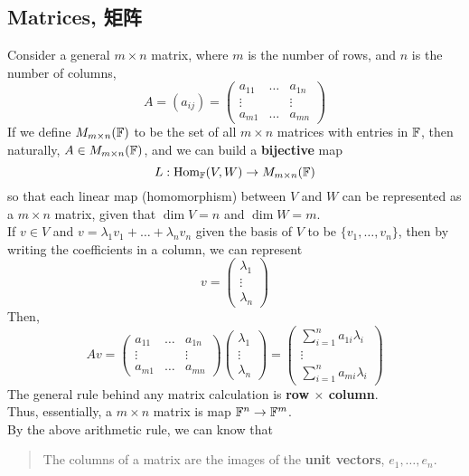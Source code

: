 \subsection{Matrices, 矩阵}
Consider a general $m\times n$ matrix, where $m$ is the number of rows, and $n$ is the number of columns,
$$A = (a_{ij}) =
\begin{pmatrix}
    a_{11} & \dots & a_{1n} \\
    \vdots & & \vdots \\
    a_{m1} & \dots & a_{mn}
\end{pmatrix}
$$
If we define $M_{m \times n}(\mathbb{F})$ to be the set of all $m \times n$ matrices with entries in $\mathbb{F}$, then naturally, $A \in M_{m \times n}(\mathbb{F})$, and we can build a \textbf{bijective} map
$$L: \text{Hom}_{\mathbb{F}}(V, W) \to M_{m \times n}(\mathbb{F})$$
so that each linear map (homomorphism) between $V$ and $W$ can be represented as a $m \times n$ matrix, given that $\dim V = n$ and $\dim W = m$. \\
If $v \in V$ and $v = \lambda_1 v_1 + \dots + \lambda_n v_n$ given the basis of $V$ to be $\{v_1, \dots, v_n\}$, then by writing the coefficients in a column, we can represent
$$v = 
\begin{pmatrix}
    \lambda_1 \\
    \vdots \\
    \lambda_n
\end{pmatrix}$$
Then,
$$Av = 
\begin{pmatrix}
    a_{11} & \dots & a_{1n} \\
    \vdots & & \vdots \\
    a_{m1} & \dots & a_{mn}
\end{pmatrix}
\begin{pmatrix}
    \lambda_1 \\
    \vdots \\
    \lambda_n
\end{pmatrix}
=
\begin{pmatrix}
    \sum_{i=1}^n a_{1i}\lambda_i \\
    \vdots \\
    \sum_{i=1}^n a_{mi}\lambda_i
\end{pmatrix}$$
The general rule behind any matrix calculation is \textbf{row $\times$ column}. \\
Thus, essentially, a $m \times n$ matrix is map $\mathbb{F}^n \to \mathbb{F}^m$. \\
By the above arithmetic rule, we can know that
\begin{quote}
    The columns of a matrix are the images of the \textbf{unit vectors}, $e_1, \dots, e_n$.
\end{quote}
